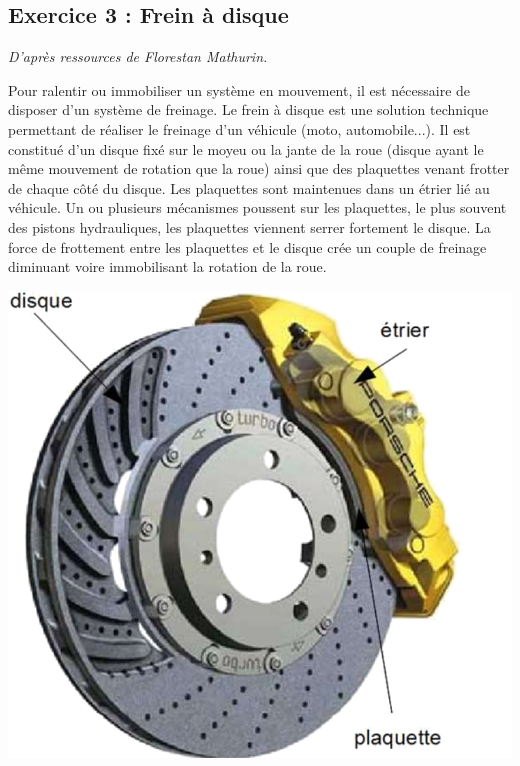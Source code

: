 \documentclass[10pt]{article}
\begin{document}
\subsection*{Exercice 3 : Frein à disque}
\setcounter{subparagraph}{0}
\begin{flushright}
\textit{D'après ressources de Florestan Mathurin.}
\end{flushright}
\begin{minipage}[c]{.6\linewidth}
Pour ralentir ou immobiliser un système en mouvement, il est nécessaire de disposer d'un système de freinage. Le frein à disque est une solution technique permettant de réaliser le freinage d'un véhicule (moto, automobile...). Il est constitué d'un disque fixé sur le moyeu ou la jante de la roue (disque ayant le même mouvement de rotation que la roue) ainsi que des plaquettes venant frotter de chaque côté du disque. Les plaquettes sont maintenues dans un étrier lié au véhicule. Un ou plusieurs mécanismes poussent sur les plaquettes, le plus souvent des pistons hydrauliques, les plaquettes viennent serrer fortement le disque. La force de frottement entre les plaquettes et le disque crée un couple de freinage diminuant voire immobilisant la rotation de la roue. 
\end{minipage} \hfill
\begin{minipage}[c]{.35\linewidth}
\begin{center}
\includegraphics[width=\textwidth]{images/frein1}
\end{center}
\end{minipage}
\end{document}
